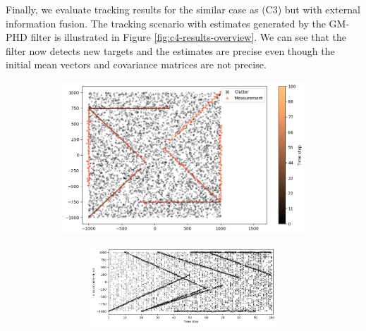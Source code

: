 
Finally, we evaluate tracking results for the similar case as (C3) but with external information fusion. The tracking scenario with estimates generated by the GM-PHD filter is illustrated in Figure \ref{fig:c4-results-overview}. We can see that the filter now detects new targets and the estimates are precise even though the initial mean vectors and covariance matrices are not precise. 

\begin{figure}
    \centering
    \begin{subfigure}[]{0.48\linewidth}
        \centering
        \includegraphics[width=\linewidth]{figures/c4-tracks-measurements.png}
    \end{subfigure}
    \hfill
    \begin{subfigure}[]{0.48\linewidth}
        \centering
        \begin{subfigure}[t]{\linewidth}
            \includegraphics[width=\linewidth]{figures/c4-x-estimates.png}
        \end{subfigure}
        \vfill\par
        \begin{subfigure}[b]{\linewidth}

\end{subfigure}
\end{subfigure}
\end{figure}
